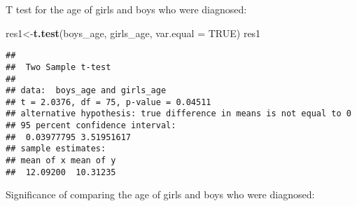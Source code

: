 \documentclass[]{article}
\newenvironment{Shaded}{\begin{snugshade}}{\end{snugshade}}
\newcommand{\CommentTok}[1]{\textcolor[rgb]{0.56,0.35,0.01}{\textit{#1}}}
\newcommand{\DataTypeTok}[1]{\textcolor[rgb]{0.13,0.29,0.53}{#1}}
\newcommand{\DecValTok}[1]{\textcolor[rgb]{0.00,0.00,0.81}{#1}}
\newcommand{\KeywordTok}[1]{\textcolor[rgb]{0.13,0.29,0.53}{\textbf{#1}}}
\newcommand{\NormalTok}[1]{#1}
\newcommand{\OperatorTok}[1]{\textcolor[rgb]{0.81,0.36,0.00}{\textbf{#1}}}
\newcommand{\OtherTok}[1]{\textcolor[rgb]{0.56,0.35,0.01}{#1}}
\newcommand{\StringTok}[1]{\textcolor[rgb]{0.31,0.60,0.02}{#1}}
\begin{document}
\begin{Shaded}
\end{Shaded}

T test for the age of girls and boys who were diagnosed:

\begin{Shaded}
\begin{Highlighting}[]
\NormalTok{res1<-}\KeywordTok{t.test}\NormalTok{(boys_age, girls_age, }\DataTypeTok{var.equal =} \OtherTok{TRUE}\NormalTok{)}
\NormalTok{res1}
\end{Highlighting}
\end{Shaded}

\begin{verbatim}
## 
##  Two Sample t-test
## 
## data:  boys_age and girls_age
## t = 2.0376, df = 75, p-value = 0.04511
## alternative hypothesis: true difference in means is not equal to 0
## 95 percent confidence interval:
##  0.03977795 3.51951617
## sample estimates:
## mean of x mean of y 
##  12.09200  10.31235
\end{verbatim}

Significance of comparing the age of girls and boys who were diagnosed:
\end{document}
